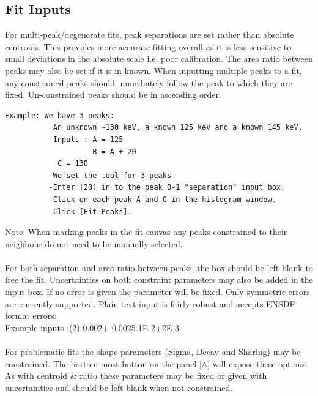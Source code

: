 \documentclass[a4paper,10pt]{article}
\begin{document}
\subsection{Fit Inputs}
For multi-peak/degenerate fits, peak separations are set rather than absolute centroids. This provides more accurate fitting overall as it is less sensitive to small deviations in the absolute scale i.e. poor calibration. The area ratio between peaks may also be set if it is in known. When inputting multiple peaks to a fit, any constrained peaks should immediately follow the peak to which they are fixed. Un-constrained peaks should be in ascending order.
\begin{lstlisting}
Example: We have 3 peaks:
           An unknown ~130 keV, a known 125 keV and a known 145 keV.
           Inputs : A = 125
                    B = A + 20
		    C = 130
          -We set the tool for 3 peaks
          -Enter [20] in to the peak 0-1 "separation" input box.
          -Click on each peak A and C in the histogram window.
          -Click [Fit Peaks].
\end{lstlisting}
Note: When marking peaks in the fit canvas any peaks constrained to their neighbour do not need to be manually selected.
\\
\\
For both separation and area ratio between peaks, the box should be left blank to free the fit. Uncertainties on both constraint parameters may also be added in the input box. If no error is given the parameter will be fixed. Only symmetric errors are currently supported. Plain text input is fairly robust and accepts ENSDF format errors:\\
Example inputs :(2) 0.002+-0.002\qquad5.1E-2+2E-3
\label{sec:errors}
\\
\\
For problematic fits the shape parameters (Sigma, Decay and Sharing) may be constrained. The bottom-most button on the panel [$\wedge$] will expose these options. As with centroid \& ratio these parameters may be fixed or given with uncertainties and should be left blank when not constrained.
\end{document}
